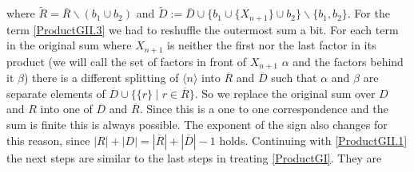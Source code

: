 \documentclass[b5paper,draft,openbib,12pt]{memoir}
\begin{document}
where \(\tilde{R}=\overline{R} \backslash (b_1\cup b_2)\) and
\(\tilde{D}:=\overline{D} \cup \{b_1 \cup \{X_{n+1}\} \cup b_2 \}\backslash \{b_1,b_2\}\). For the term 
\eqref{ProductGII.3} we had to reshuffle the outermost
sum a bit. For each term in the original sum where \(X_{n+1}\) is neither the first nor the last factor in its product (we will call the set of factors in front of \(X_{n+1}\)  \( \alpha\) and the factors behind it \(\beta\)) there is a different splitting of \(\langle n \rangle \) into \(\overline{R}\) and \(\overline{D}\) such that \(\alpha\) and \(\beta\) are separate elements of \(\overline{D}\cup \{\{r\}\mid r \in \overline R\}\).
So we replace the original sum over \(D\) and \(R\) into one of \(\overline{D}\) and \(\overline{R}\). Since this is a one to one
correspondence and the sum is finite this is always possible. The exponent of the sign also changes for this reason, since
\(|R|+|D|=|\overline{R}|+|\overline{D}|-1\) holds. Continuing with \eqref{ProductGII.1} the next steps are similar to the last steps
in treating \eqref{ProductGI}. They are
\end{document}
